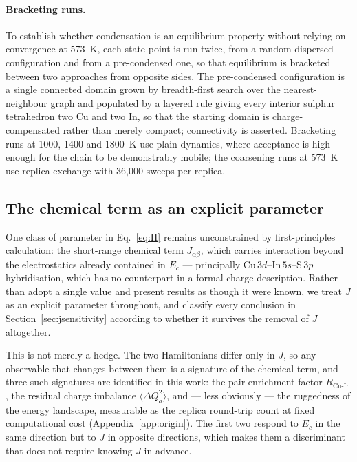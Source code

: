 \documentclass[11pt,a4paper]{article}
\newcommand{\dQ}{\Delta Q}
\newcommand{\RCuIn}{R_{\mathrm{Cu\text{-}In}}}
\begin{document}
\paragraph{Bracketing runs.} To establish whether condensation is an equilibrium
property without relying on convergence at 573~K, each state point is run twice,
from a random dispersed configuration and from a pre-condensed one, so that
equilibrium is bracketed between two approaches from opposite sides. The
pre-condensed configuration is a single connected domain grown by breadth-first
search over the nearest-neighbour graph and populated by a layered rule giving
every interior sulphur tetrahedron two Cu and two In, so that the starting
domain is charge-compensated rather than merely compact; connectivity is
asserted. Bracketing runs at 1000, 1400 and 1800~K use plain dynamics, where
acceptance is high enough for the chain to be demonstrably mobile; the
coarsening runs at 573~K use replica exchange with 36{,}000 sweeps per replica.

\subsection{The chemical term as an explicit parameter}
\label{sec:dftplan}

One class of parameter in Eq.~\eqref{eq:H} remains unconstrained by
first-principles calculation: the short-range chemical term $J_{\alpha\beta}$,
which carries interaction beyond the electrostatics already contained in $E_c$
--- principally Cu\,$3d$--In\,$5s$--S\,$3p$ hybridisation, which has no
counterpart in a formal-charge description. Rather than adopt a single value and
present results as though it were known, we treat $J$ as an explicit parameter
throughout, and classify every conclusion in Section~\ref{sec:jsensitivity}
according to whether it survives the removal of $J$ altogether.

This is not merely a hedge. The two Hamiltonians differ only in $J$, so any
observable that changes between them is a signature of the chemical term, and
three such signatures are identified in this work: the pair enrichment factor
$\RCuIn$, the residual charge imbalance $\langle\dQ_a^2\rangle$, and --- less
obviously --- the ruggedness of the energy landscape, measurable as the replica
round-trip count at fixed computational cost (Appendix~\ref{app:origin}). The
first two respond to $E_c$ in the same direction but to $J$ in opposite
directions, which makes them a discriminant that does not require knowing $J$ in
advance.
\end{document}
